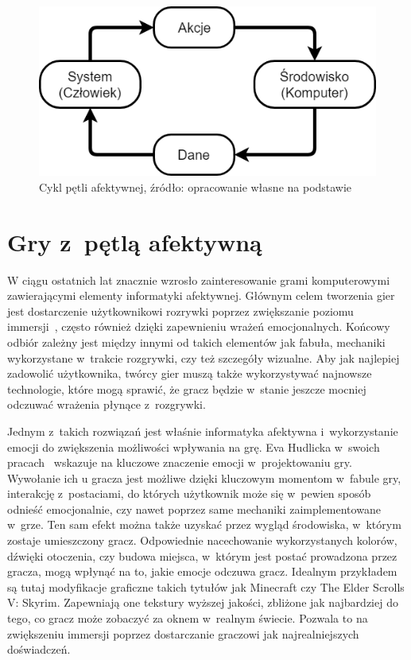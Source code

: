 \begin{figure}
	\centering
	\includegraphics[width=0.6\linewidth]{images/affective_loop.png}
	\caption{Cykl pętli afektywnej, źródło: opracowanie własne na podstawie~\cite{affective_loop_experiences}}
	\label{fig:affective_loop}
\end{figure}

\section{Gry z~pętlą afektywną}
W ciągu ostatnich lat znacznie wzrosło zainteresowanie grami komputerowymi zawierającymi elementy informatyki afektywnej. Głównym celem tworzenia gier jest dostarczenie użytkownikowi rozrywki poprzez zwiększanie poziomu immersji~\cite{jennet_immersion_in_games_2008}, często również dzięki zapewnieniu wrażeń emocjonalnych. Końcowy odbiór zależny jest między innymi od takich elementów jak fabuła, mechaniki wykorzystane w~trakcie rozgrywki, czy też szczegóły wizualne. Aby jak najlepiej zadowolić użytkownika, twórcy gier muszą także wykorzystywać najnowsze technologie, które mogą sprawić, że gracz będzie w~stanie jeszcze mocniej odczuwać wrażenia płynące z~rozgrywki. 

Jednym z~takich rozwiązań jest właśnie informatyka afektywna i~wykorzystanie emocji do zwiększenia możliwości wpływania na grę. Eva Hudlicka w~swoich pracach~\cite{hudlicka_2008} wskazuje na kluczowe znaczenie emocji w~projektowaniu gry. Wywołanie ich u gracza jest możliwe dzięki kluczowym momentom w~fabule gry, interakcję z~postaciami, do których użytkownik może się w~pewien sposób odnieść emocjonalnie, czy nawet poprzez same mechaniki zaimplementowane w~grze. Ten sam efekt można także uzyskać przez wygląd środowiska, w~którym zostaje umieszczony gracz. Odpowiednie nacechowanie wykorzystanych kolorów, dźwięki otoczenia, czy budowa miejsca, w~którym jest postać prowadzona przez gracza, mogą wpłynąć na to, jakie emocje odczuwa gracz. Idealnym przykładem są tutaj modyfikacje graficzne takich tytułów jak Minecraft czy The Elder Scrolls V: Skyrim. Zapewniają one tekstury wyższej jakości, zbliżone jak najbardziej do tego, co gracz może zobaczyć za oknem w~realnym świecie. Pozwala to na zwiększeniu immersji poprzez dostarczanie graczowi jak najrealniejszych doświadczeń.

